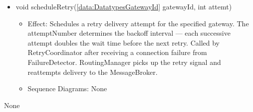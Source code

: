 \begin{description}
\begin{itemize}[noitemsep,nolistsep,leftmargin=-.25cm]
      \item \textsf{void scheduleRetry(\ref{data:DatatypesGatewayId} gatewayId, int attemt)}
        \begin{itemize}[noitemsep,nolistsep]
           \item Effect: Schedules a retry delivery attempt for the specified gateway. The attemptNumber determines the backoff interval — each successive attempt doubles the wait time before the next retry. Called by RetryCoordinator after receiving a connection failure from FailureDetector. RoutingManager picks up the retry signal and reattempts delivery to the MessageBroker. 
           \item Sequence Diagrams: None
        \end{itemize}
    \end{itemize}
      \item[Diagrams:] None
    \end{description}


